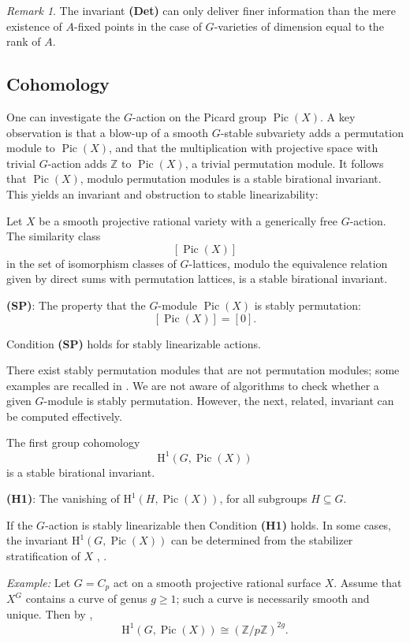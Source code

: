 \documentclass[12pt,reqno]{amsart}
\theoremstyle{plain}
\theoremstyle{remark}
\newtheorem{rema}[prop]{Remark}
\theoremstyle{definition}
\numberwithin{equation}{section}
\newcommand{\Z}{{\mathbb Z}}
\newcommand{\rH}{{\mathrm H}}
\newcommand{\bZ}{{\mathbb Z}}
\DeclareMathOperator{\Pic}{Pic}
\begin{document}
\begin{rema}
\label{rem.Detlimitation}
The invariant {\bf (Det)} can only deliver finer information than the mere existence of $A$-fixed points in the case of $G$-varieties of dimension equal to the rank of $A$.
\end{rema}

\subsection{Cohomology}
\label{sect:coho}


One can investigate the $G$-action on the Picard group $\Pic(X)$.
A key observation is that a blow-up of a smooth $G$-stable subvariety adds a permutation module to $\Pic(X)$, and that the multiplication with projective space with trivial $G$-action adds $\Z$ to $\Pic(X)$, a trivial permutation module. It follows that $\Pic(X)$, modulo permutation modules is a stable birational invariant. This yields an invariant and obstruction to stable linearizability:


Let $X$ be a smooth projective rational variety with a generically free $G$-action. 
The similarity class 
$$
[\Pic(X)]
$$
in the set of isomorphism classes of $G$-lattices, modulo the equivalence relation given by direct sums with permutation lattices,
is a stable birational invariant.


\medskip
\noindent
{\bf (SP)}: The property that the $G$-module $\Pic(X)$ is stably permutation:
$$
[\Pic(X)]=[0].
$$

Condition {\bf (SP)} holds for stably linearizable actions.

There exist stably permutation modules that are not permutation modules; some examples are recalled in \cite[Sect.\ 1]{hoshiyamasaki}.
We are not aware of algorithms to check whether a given $G$-module is stably permutation. 
However, the next, related, invariant can be computed effectively.

\medskip
The first group cohomology
$$
\rH^1(G, \Pic(X))
$$
is a stable birational invariant.

\medskip
\noindent
{\bf (H1)}: The vanishing of $\rH^1(H, \Pic(X))$, for all subgroups $H\subseteq G$.

\medskip
If the $G$-action is stably linearizable then Condition {\bf (H1)} holds.
In some cases, the invariant $\rH^1(G,\Pic(X))$ can be determined from the stabilizer stratification of $X$ \cite{BogPro}, \cite{KT-dp}.


\medskip
\noindent
{\em Example:} Let $G=C_p$ act on a smooth projective rational surface $X$. Assume that $X^G$ contains a curve of genus $g \ge 1$; such a curve is necessarily smooth and unique. Then by \cite{BogPro}, 
$$
\rH^1(G,\Pic(X)) \cong (\bZ/p\bZ)^{2g}.
$$
\end{document}

